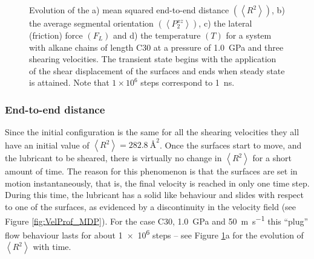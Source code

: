 \documentclass[aps,prb,reprint,superscriptaddress, a4paper]{revtex4-1}
\begin{document}
\begin{figure}
\begin{center}
		\caption{Evolution of the a) mean squared end-to-end distance $\left(\left< R^2 \right>\right)$, b) the average segmental orientation  $\left(\left<P_{2}^{xz}\right>\right)$, c) the lateral (friction) force  $\left(F_L\right)$ and d) the temperature $\left(T\right)$ for a system with alkane chains of length C30 at a pressure of \SI{1.0}{\giga\pascal} and  three  shearing velocities. The transient state begins with the application of the shear displacement of the surfaces and ends when  steady state is attained. Note that $1 \times 10^{6}$ steps correspond to  \SI{1}{\nano\second}.}
		\label{fig:SS}
	\end{center}
 \end{figure}

\subsubsection{End-to-end distance}

Since the initial configuration is the same for all the shearing velocities  they all have an initial value of  $\left< R^2 \right> = \SI{282.8}{\angstrom\squared}$. Once the surfaces start to move, and the lubricant to be sheared, there is virtually no change in $\left< R^2 \right> $ for a short amount of time. The reason for this phenomenon is that the surfaces are set in motion  instantaneously, that is, the final velocity is reached in only one time step.  During this time, the lubricant has a solid like behaviour and slides with respect to one of the surfaces, as evidenced by a discontinuity in the velocity field (see Figure \ref{fig:VelProf_MDP}).    For the case C30, \SI{1.0}{\giga\pascal} and \SI{50}{\meter\per\second} this ``plug'' flow  behaviour  lasts for about \SI{1e6}{} steps  -- see Figure \ref{fig:SS}a for the evolution of $\left< R^2 \right> $ with time.
\end{document}

